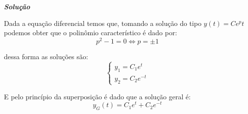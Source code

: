 \linespread{1.5}

\textit{\textbf{Solução}}

Dada a equação diferencial temos que, tomando a solução do tipo $ y(t) = Ce^pt $ podemos obter que o polinômio característico é dado por:
\begin{equation*}
    p^2 - 1 = 0 \Longleftrightarrow p = \pm 1
\end{equation*}

dessa forma as soluções são:
\begin{equation*}
    \begin{cases}
    y_1 = C_1e^t\\
    y_2 = C_2e^{-t}
    \end{cases}
\end{equation*}

E pelo princípio da superposição é dado que a solução geral é:
\begin{equation*}
    y_G(t) = C_1e^t + C_2e^{-t}
\end{equation*}